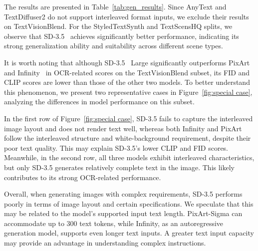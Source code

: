 The results are presented in Table~\ref{tab:gen_results}.  
Since AnyText and TextDiffuser2 do not support interleaved format inputs, we exclude their results on TextVisionBlend.  
For the StyledTextSynth and TextScensHQ splits, we observe that SD-3.5~\cite{sd3} achieves significantly better performance, indicating its strong generalization ability and suitability across different scene types.

It is worth noting that although SD-3.5~\cite{sd3} Large significantly outperforms PixArt~\cite{pixart} and Infinity~\cite{han2024infinity} in OCR-related scores on the TextVisionBlend subset, its FID and CLIP scores are lower than those of the other two models. To better understand this phenomenon, we present two representative cases in Figure~\ref{fig:special case}, analyzing the differences in model performance on this subset.

In the first row of Figure~\ref{fig:special case}, SD-3.5 fails to capture the interleaved image layout and does not render text well, whereas both Infinity and PixArt follow the interleaved structure and white-background requirement, despite their poor text quality. This may explain SD-3.5’s lower CLIP and FID scores. Meanwhile, in the second row, all three models exhibit interleaved characteristics, but only SD-3.5 generates relatively complete text in the image. This likely contributes to its strong OCR-related performance.

Overall, when generating images with complex requirements, SD-3.5 performs poorly in terms of image layout and certain specifications. We speculate that this may be related to the model's supported input text length. PixArt-Sigma can accommodate up to 300 text tokens, while Infinity, as an autoregressive generation model, supports even longer text inputs. A greater text input capacity may provide an advantage in understanding complex instructions.

